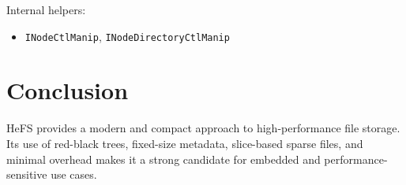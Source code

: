 \documentclass{article}
\begin{document}
Internal helpers:
\begin{itemize}
  \item \texttt{INodeCtlManip}, \texttt{INodeDirectoryCtlManip}
\end{itemize}

\section{Conclusion}
HeFS provides a modern and compact approach to high-performance file storage. Its use of red-black trees, fixed-size metadata, slice-based sparse files, and minimal overhead makes it a strong candidate for embedded and performance-sensitive use cases.
\end{document}

